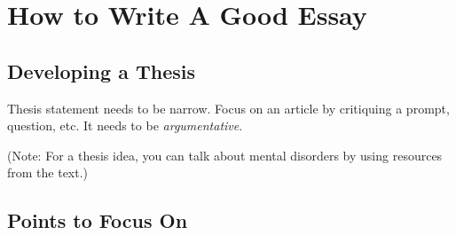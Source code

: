 \documentclass[11pt]{article}
\begin{document}
\section{How to Write A Good Essay}

\subsection{Developing a Thesis}

Thesis statement needs to be narrow. Focus on an article by critiquing a prompt, question, etc. It needs to be \textit{argumentative}.

(Note: For a thesis idea, you can talk about mental disorders by using resources from the text.)

\subsection{Points to Focus On}
\end{document}
